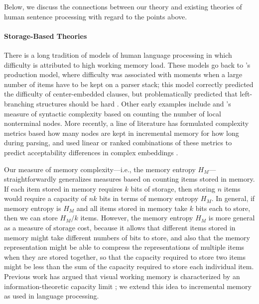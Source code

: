 Below, we discuss the connections between our theory and existing theories of human sentence processing with regard to the points above.

\paragraph{Storage-Based Theories}

There is a long tradition of models of human language processing in which difficulty is attributed to high working memory load. 
These models go back to \citet{yngve1960model}'s production model, where difficulty was associated with moments when a large number of items have to be kept on a parser stack; this model correctly predicted the difficulty of center-embedded clauses, but problematically predicted that left-branching structures should be hard \citep{kimball1973seven}. Other early examples include \citet{miller-finitary-1963} and \citet{frazier1985syntactic}'s measure of syntactic complexity based on counting the number of local nonterminal nodes. More recently, a line of literature has formulated complexity metrics based how many nodes are kept in incremental memory for how long during parsing, and used linear or ranked combinations of these metrics to predict acceptability differences in complex embeddings \citep{kobele2013memory,graf2014evaluating,rambow201512,GrafEtAl15MOL,gerth2015memory,GrafEtAl17JLM,desanto2020parsing}.


Our measure of memory complexity---i.e., the memory entropy $H_M$---straightforwardly generalizes measures based on counting items stored in memory. If each item stored in memory requires $k$ bits of storage, then storing $n$ items would require a capacity of $nk$ bits in terms of memory entropy $H_M$. In general, if memory entropy is $H_M$ and all items stored in memory take $k$ bits each to store, then we can store $H_M/k$ items. However, the memory entropy $H_M$ is more general as a measure of storage cost, because it allows that different items stored in memory might take different numbers of bits to store, and also that the memory representation might be able to compress the representations of multiple items when they are stored together, so that the capacity required to store two items might be less than the sum of the capacity required to store each individual item. Previous work has argued that visual working memory is characterized by an information-theoretic capacity limit \citep{brady2008efficient,sims2012ideal}; we extend this idea to incremental memory as used in language processing.

